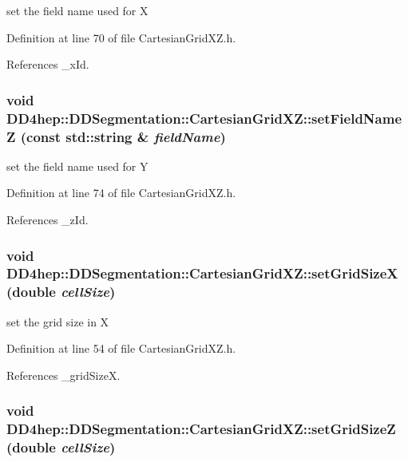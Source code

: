 set the field name used for X 

Definition at line 70 of file CartesianGridXZ.h.

References \_\-xId.\hypertarget{class_d_d4hep_1_1_d_d_segmentation_1_1_cartesian_grid_x_z_a46cc52729cf997b7e0ba497b43476fe2}{
\subsubsection[{setFieldNameZ}]{\setlength{\rightskip}{0pt plus 5cm}void DD4hep::DDSegmentation::CartesianGridXZ::setFieldNameZ (const std::string \& {\em fieldName})}}
\label{class_d_d4hep_1_1_d_d_segmentation_1_1_cartesian_grid_x_z_a46cc52729cf997b7e0ba497b43476fe2}


set the field name used for Y 

Definition at line 74 of file CartesianGridXZ.h.

References \_\-zId.\hypertarget{class_d_d4hep_1_1_d_d_segmentation_1_1_cartesian_grid_x_z_af1370288c6bf2194666a6faa4f6bd563}{
\subsubsection[{setGridSizeX}]{\setlength{\rightskip}{0pt plus 5cm}void DD4hep::DDSegmentation::CartesianGridXZ::setGridSizeX (double {\em cellSize})}}
\label{class_d_d4hep_1_1_d_d_segmentation_1_1_cartesian_grid_x_z_af1370288c6bf2194666a6faa4f6bd563}


set the grid size in X 

Definition at line 54 of file CartesianGridXZ.h.

References \_\-gridSizeX.\hypertarget{class_d_d4hep_1_1_d_d_segmentation_1_1_cartesian_grid_x_z_aaef2c9c85c9d1325ab98690f33793ce1}{
\subsubsection[{setGridSizeZ}]{\setlength{\rightskip}{0pt plus 5cm}void DD4hep::DDSegmentation::CartesianGridXZ::setGridSizeZ (double {\em cellSize})}}
\label{class_d_d4hep_1_1_d_d_segmentation_1_1_cartesian_grid_x_z_aaef2c9c85c9d1325ab98690f33793ce1}


